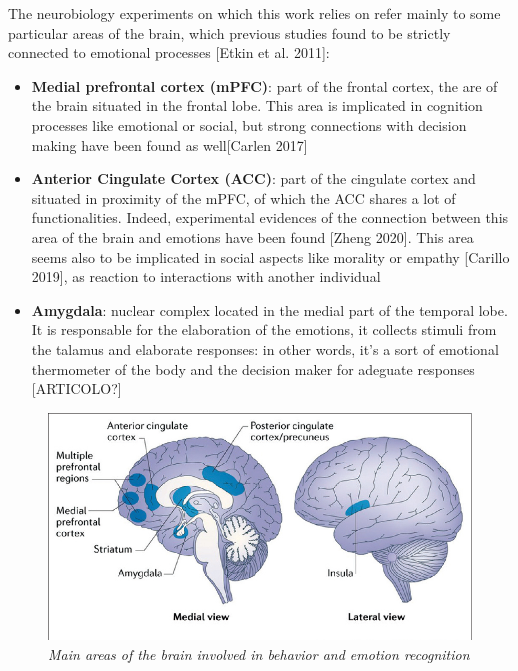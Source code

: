 \documentclass[a4paper]{article}
\begin{document}
	
	The neurobiology experiments on which this work relies on refer mainly to some particular areas of the brain, which previous studies found to be strictly connected to emotional processes [Etkin et al. 2011]:
	\begin{itemize}
		
		\item \textbf{Medial prefrontal cortex (mPFC)}:  part of the frontal cortex, the are of the brain situated in the frontal lobe. This area is implicated in cognition processes like emotional or social, but strong connections with decision making have been found as well[Carlen 2017]
		
		\item \textbf{Anterior Cingulate Cortex (ACC)}: part of the cingulate cortex and situated in proximity of the mPFC,  of which the ACC shares a lot of functionalities. Indeed, experimental evidences of the connection between this area of the brain and emotions have been found [Zheng 2020]. This area seems also to be implicated in social aspects like morality or empathy [Carillo 2019], as reaction to interactions with another individual
		
		\item \textbf{Amygdala}: nuclear complex located in the medial part of the temporal lobe. It is responsable for the elaboration of the emotions, it collects stimuli from the talamus and elaborate responses: in other words, it's a sort of emotional thermometer of the body and the decision maker for adeguate responses [ARTICOLO?]
	\end{itemize}


	
	\begin{figure}[H]
		\begin{center}
			\includegraphics[scale=.55]{brain.png} 
		\end{center} 
		\caption{\textit{Main areas of the brain involved in behavior and emotion recognition}}
		
	\end{figure}
\end{document}

